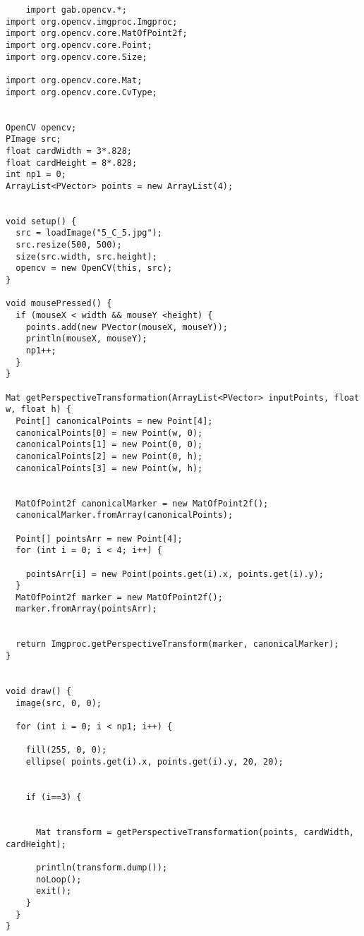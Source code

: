\documentclass[11pt, twoside, reqno]{book}
\begin{document}
\begin{Verbatim}
	import gab.opencv.*;
import org.opencv.imgproc.Imgproc;
import org.opencv.core.MatOfPoint2f;
import org.opencv.core.Point;
import org.opencv.core.Size;

import org.opencv.core.Mat;
import org.opencv.core.CvType;


OpenCV opencv;
PImage src;
float cardWidth = 3*.828;
float cardHeight = 8*.828;
int np1 = 0;
ArrayList<PVector> points = new ArrayList(4); 


void setup() {
  src = loadImage("5_C_5.jpg");
  src.resize(500, 500);
  size(src.width, src.height);
  opencv = new OpenCV(this, src);
}

void mousePressed() {
  if (mouseX < width && mouseY <height) {
    points.add(new PVector(mouseX, mouseY));
    println(mouseX, mouseY);
    np1++;
  }
}

Mat getPerspectiveTransformation(ArrayList<PVector> inputPoints, float w, float h) {
  Point[] canonicalPoints = new Point[4]; 
  canonicalPoints[0] = new Point(w, 0); 
  canonicalPoints[1] = new Point(0, 0);
  canonicalPoints[2] = new Point(0, h);
  canonicalPoints[3] = new Point(w, h);


  MatOfPoint2f canonicalMarker = new MatOfPoint2f();
  canonicalMarker.fromArray(canonicalPoints); 

  Point[] pointsArr = new Point[4]; 
  for (int i = 0; i < 4; i++) {

    pointsArr[i] = new Point(points.get(i).x, points.get(i).y);
  }
  MatOfPoint2f marker = new MatOfPoint2f();
  marker.fromArray(pointsArr);


  return Imgproc.getPerspectiveTransform(marker, canonicalMarker);
}


void draw() {
  image(src, 0, 0);

  for (int i = 0; i < np1; i++) {

    fill(255, 0, 0);
    ellipse( points.get(i).x, points.get(i).y, 20, 20);


    if (i==3) {


      Mat transform = getPerspectiveTransformation(points, cardWidth, cardHeight);

      println(transform.dump());
      noLoop();
      exit();
    }
  }
}


\end{Verbatim}
\end{document}
